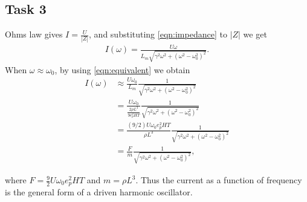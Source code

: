 \documentclass[12pt]{article}
\begin{document}
\subsection{Task 3}
Ohms law gives $I = \frac{U}{|Z|}$, and substituting \ref{eqn:impedance} to $|Z|$ we get
\begin{align}
	I(\omega) = \frac{U\omega}{L_m\sqrt{\gamma^2\omega^2 +\left(\omega^2 - \omega_0^2\right)^2}}.
\end{align}
When $\omega \approx \omega_0$, by using \eqref{eqn:equivalent} we obtain
\begin{align*}
	I(\omega) &\approx \frac{U\omega_0}{L_m}\frac{1}{\sqrt{\gamma^2\omega^2 +\left(\omega^2 - \omega_0^2\right)^2}}\\
	&=\frac{U\omega_0}{\frac{2\rho L^3}{9e_p^2HT}}\frac{1}{\sqrt{\gamma^2\omega^2 +\left(\omega^2 - \omega_0^2\right)^2}}\\
	&=\frac{(9/2)U\omega_0e_p^2HT}{\rho L^3}\frac{1}{\sqrt{\gamma^2\omega^2 +\left(\omega^2 - \omega_0^2\right)^2}}\\
	&=\frac{F}{m}\frac{1}{\sqrt{\gamma^2\omega^2 +\left(\omega^2 - \omega_0^2\right)^2}},
\end{align*}

where $F = \frac{9}{2}U\omega_0e_p^2HT$ and $m = \rho L^3$. Thus the current as a function of frequency is the general form of a driven harmonic oscillator.
\end{document}
